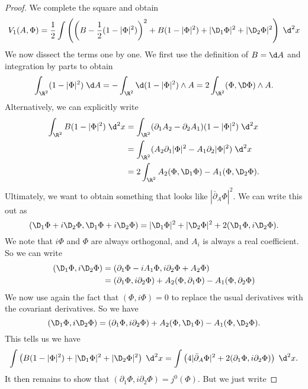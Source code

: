 \documentclass[a4paper]{article}
\begin{document}
\begin{proof}
  We complete the square and obtain
  \[
    V_1(A, \Phi) = \frac{1}{2} \int \left(\left(B - \frac{1}{2}(1 - |\Phi|^2)\right)^2 + B(1 - |\Phi|^2) + |\D_1\Phi|^2 + |\D_2 \Phi|^2\right)\;\d^2 x
  \]
  We now dissect the terms one by one. We first use the definition of $B = \d A$ and integration by parts to obtain
  \[
    \int_{\R^2} (1 - |\Phi|^2) \;\d A = - \int_{\R^2} \d (1 - |\Phi|^2) \wedge A = 2 \int_{\R^2} (\Phi, \D \Phi) \wedge A.
  \]
  Alternatively, we can explicitly write
  \begin{align*}
    \int_{\R^2} B(1 - |\Phi|^2) \;\d^2 x &= \int_{\R^2} (\partial_1 A_2 - \partial_2 A_1) (1 - |\Phi|^2)\;\d ^2x\\
    &= \int_{\R^2} (A_2 \partial_1 |\Phi|^2 - A_1 \partial_2 |\Phi|^2) \;\d^2 x \\
    &= 2\int_{\R^2} A_2 (\Phi, \D_1 \Phi) - A_1 (\Phi, \D_2 \Phi).
  \end{align*}
  Ultimately, we want to obtain something that looks like $|\bar{\partial}_A \Phi|^2$. We can write this out as
  \[
    (\D_1 \Phi + i \D_2 \Phi, \D_1 \Phi + i \D_2 \Phi) = |\D_1 \Phi|^2 + |\D_2 \Phi|^2 + 2(\D_1 \Phi, i \D_2 \Phi).
  \]
  We note that $i\Phi$ and $\Phi$ are always orthogonal, and $A_i$ is always a real coefficient. So we can write
  \begin{align*}
    (\D_1 \Phi, i \D_2 \Phi) &= (\partial_1 \Phi - i A_1 \Phi, i \partial_2 \Phi + A_2 \Phi) \\
    &= (\partial_1 \Phi, i \partial _2 \Phi) + A_2 (\Phi, \partial_1 \Phi) - A_1 (\Phi, \partial_2 \Phi)
  \end{align*}
  We now use again the fact that $(\Phi, i\Phi) = 0$ to replace the usual derivatives with the covariant derivatives. So we have
  \[
    (\D_1 \Phi, i \D_2 \Phi) = (\partial_1 \Phi, i \partial_2 \Phi) + A_2 (\Phi, \D_1 \Phi) - A_1 (\Phi, \D_2 \Phi).
  \]
  This tells us we have
  \[
    \int \left(B(1 - |\Phi|^2) + |\D_1 \Phi|^2 + |\D_2 \Phi|^2\right)\;\d^2 x = \int \left(4 |\bar{\partial}_A \Phi|^2 + 2 (\partial_1 \Phi, i \partial_2 \Phi)\right)\;\d^2 x.
  \]
  It then remains to show that $(\partial_1 \Phi, i \partial_2 \Phi) = j^0(\Phi)$. But we just write

\end{proof}
\end{document}

